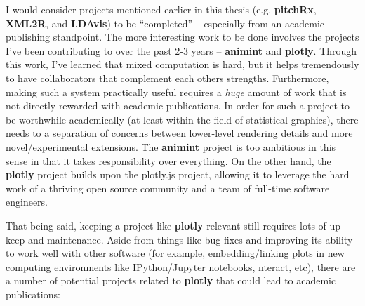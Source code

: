\documentclass[12pt,]{isuthesis}
\begin{document}
I would consider projects mentioned earlier in this thesis (e.g.
\textbf{pitchRx}, \textbf{XML2R}, and \textbf{LDAvis}) to be
``completed'' -- especially from an academic publishing standpoint. The
more interesting work to be done involves the projects I've been
contributing to over the past 2-3 years -- \textbf{animint} and
\textbf{plotly}. Through this work, I've learned that mixed computation
is hard, but it helps tremendously to have collaborators that complement
each others strengths. Furthermore, making such a system practically
useful requires a \emph{huge} amount of work that is not directly
rewarded with academic publications. In order for such a project to be
worthwhile academically (at least within the field of statistical
graphics), there needs to a separation of concerns between lower-level
rendering details and more novel/experimental extensions. The
\textbf{animint} project is too ambitious in this sense in that it takes
responsibility over everything. On the other hand, the \textbf{plotly}
project builds upon the plotly.js project, allowing it to leverage the
hard work of a thriving open source community and a team of full-time
software engineers.

That being said, keeping a project like \textbf{plotly} relevant still
requires lots of up-keep and maintenance. Aside from things like bug
fixes and improving its ability to work well with other software (for
example, embedding/linking plots in new computing environments like
IPython/Jupyter notebooks, nteract, etc), there are a number of
potential projects related to \textbf{plotly} that could lead to
academic publications:
\end{document}

